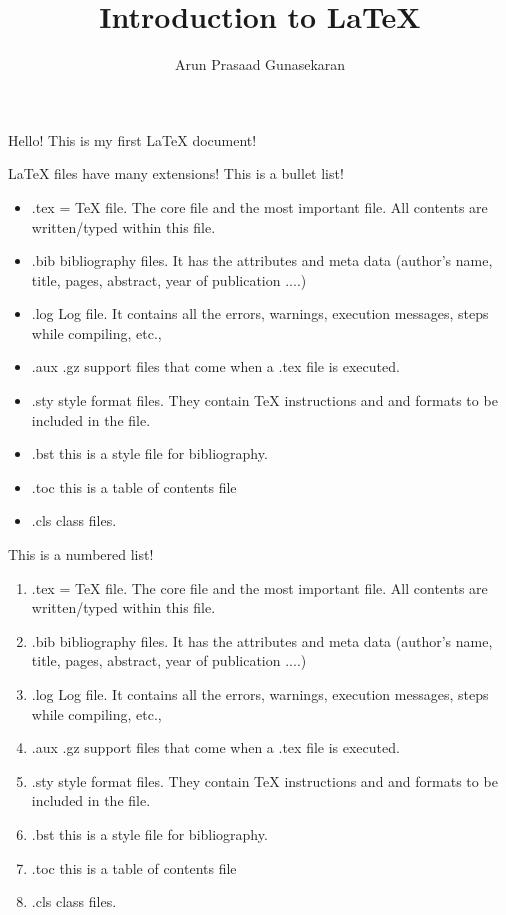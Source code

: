 \documentclass[10pt,a4paper,twoside]{article}
\author{Arun Prasaad Gunasekaran}
\title{Introduction to LaTeX}
\begin{document}
\maketitle
Hello! This is my first LaTeX document! 

LaTeX files have many extensions!
This is a bullet list!
\begin{itemize}
\item .tex = TeX file. The core file and the most important file. All contents are written/typed within this file.
\item .bib bibliography files. It has the attributes and meta data (author's name, title, pages, abstract, year of publication ....)
\item .log Log file. It contains all the errors, warnings, execution messages, steps while compiling, etc.,
\item .aux .gz support files that come when a .tex file is executed.
\item .sty style format files. They contain TeX instructions and and formats to be included in the file.
\item .bst this is a style file for bibliography.
\item .toc this is a table of contents file
\item .cls class files.
\end{itemize}

This is a numbered list!
\begin{enumerate}
\item .tex = TeX file. The core file and the most important file. All contents are written/typed within this file.
\item .bib bibliography files. It has the attributes and meta data (author's name, title, pages, abstract, year of publication ....)
\item .log Log file. It contains all the errors, warnings, execution messages, steps while compiling, etc.,
\item .aux .gz support files that come when a .tex file is executed.
\item .sty style format files. They contain TeX instructions and and formats to be included in the file.
\item .bst this is a style file for bibliography.
\item .toc this is a table of contents file
\item .cls class files.
\end{enumerate}
\end{document}

